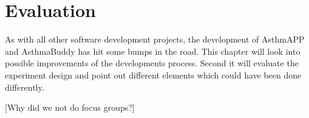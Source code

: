 \chapter{Evaluation}
\label{chp:evaluation}

As with all other software development projects, the development of AsthmAPP and AsthmaBuddy has hit some bumps in the road. This chapter will look into possible improvements of the developments process. Second it will evaluate the experiment design and point out different elements which could have been done differently.


[Why did we not do focus groups?]